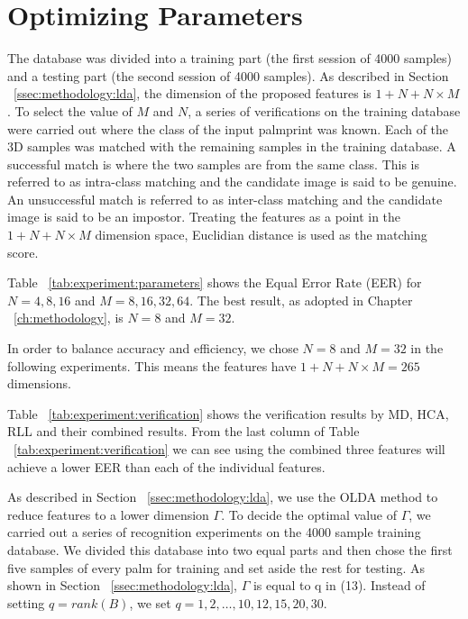 \section{Optimizing Parameters}
\label{sec:experiment:parameters}

The database was divided into a training part (the first session of 4000 samples) and a testing part (the second session of 4000 samples). As described in Section ~\ref{ssec:methodology:lda}, the dimension of the proposed  features is $1+N+N\times M$. To select the value of $M$ and $N$, a series of verifications on the training database were carried out where the class of the input palmprint was known. Each of the 3D samples was matched with the remaining samples in the training database. A successful match is where the two samples are from the same class. This is referred to as intra-class matching and the candidate image is said to be genuine. An unsuccessful match is referred to as inter-class matching and the candidate image is said to be an impostor. Treating the features as a point in the $1+N+N\times M$ dimension space, Euclidian distance is used as the matching score.




Table ~\ref{tab:experiment:parameters} shows the Equal Error Rate (EER) for $N=4,8,16$ and $M=8,16,32,64$. The best result, as adopted in Chapter ~\ref{ch:methodology}, is $N=8$ and $M=32$.


In order to balance accuracy and efficiency, we chose $N=8$ and $M=32$ in the following experiments. This means the features have $1+N+N\times M=265$ dimensions.



Table ~\ref{tab:experiment:verification} shows the verification results by MD, HCA, RLL and their combined results. From the last column of Table ~\ref{tab:experiment:verification} we can see using the combined three features will achieve a lower EER than each of the individual features.

As described in Section ~\ref{ssec:methodology:lda}, we use the OLDA method to reduce features to a lower dimension $\Gamma$. To decide the optimal value of $\Gamma$, we carried out a series of recognition experiments on the 4000 sample training database. We divided this database into two equal parts and then chose the first five samples of every palm for training and set aside the rest for testing. As shown in Section ~\ref{ssec:methodology:lda}, $\Gamma$ is equal to q in (13). Instead of setting $q=rank(B)$, we set $q=1,2,\dots,10,12,15,20,30$.


